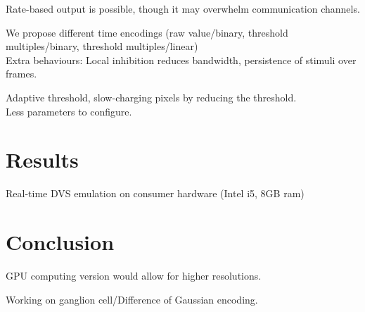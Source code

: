 \documentclass[]{article}
\begin{document}
Rate-based output is possible, though it may overwhelm communication channels.

We propose different time encodings (raw value/binary, threshold multiples/binary, threshold multiples/linear)\\

Extra behaviours: Local inhibition reduces bandwidth, persistence of stimuli over frames. 

Adaptive threshold, slow-charging pixels by reducing the threshold.\\
Less parameters to configure.

\section{Results}

Real-time DVS emulation on consumer hardware (Intel i5, 8GB ram)

\section{Conclusion}

GPU computing version would allow for higher resolutions.

Working on ganglion cell/Difference of Gaussian encoding.
\end{document}
